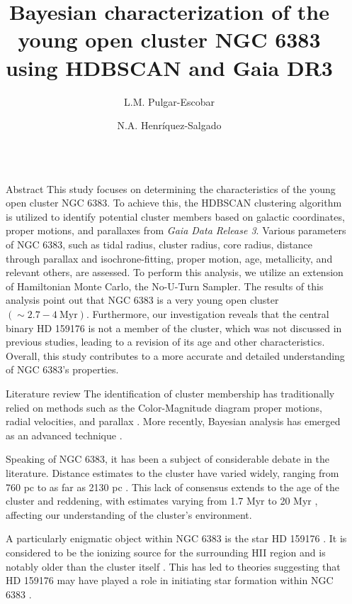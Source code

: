 \documentclass[final]{beamer}
\title{Bayesian characterization of the young open cluster NGC 6383 using HDBSCAN and Gaia DR3}
\author{L.M. Pulgar-Escobar \inst{1} \and N.A. Henríquez-Salgado \inst{1}}
\institute[UdeC]{\inst{1}~Departamento de Astronom{\'\i}a, Universidad de Concepci\'on, Chile}
\newlength{\sepwidth}
\newlength{\colwidth}
\newcommand{\separatorcolumn}{\begin{column}{\sepwidth}\end{column}}
\begin{document}
\begin{frame}[t]
\begin{columns}[t]
\separatorcolumn
\begin{column}{\colwidth}
  \begin{block}{Abstract}
    This study focuses on determining the characteristics of the young open cluster NGC 6383. To achieve this, the HDBSCAN clustering algorithm is utilized to identify potential cluster members based on galactic coordinates, proper motions, and parallaxes from {\sl Gaia Data Release 3}. Various parameters of NGC 6383, such as tidal radius, cluster radius, core radius, distance through parallax and isochrone-fitting, proper motion, age, metallicity, and relevant others, are assessed. To perform this analysis, we utilize an extension of Hamiltonian Monte Carlo, the No-U-Turn Sampler. The results of this analysis point out that NGC 6383 is a very young open cluster $(\sim 2.7 - 4~\mathrm{Myr})$. Furthermore, our investigation reveals that the central binary HD 159176 is not a member of the cluster, which was not discussed in previous studies, leading to a revision of its age and other characteristics. Overall, this study contributes to a more accurate and detailed understanding of NGC 6383's properties.
  \end{block}
  \begin{block}{Literature review}
The identification of cluster membership has traditionally relied on methods such as the Color-Magnitude diagram proper motions, radial velocities, and parallax \citep{2018A&A...610A..30A,1930LicOB..14..154T}. More recently, Bayesian analysis has emerged as an advanced technique \citep{2018A&A...610A..30A}.

Speaking of NGC 6383, it has been a subject of considerable debate in the literature. Distance estimates to the cluster have varied widely, ranging from 760 pc to as far as 2130 pc \citep{1930LicOB..14..154T, 1937LicOB..18...89Z, 1949ApJ...110..117S, 2018A&A...610A..30A}. This lack of consensus extends to the age of the cluster and reddening, with estimates varying from 1.7 Myr to 20 Myr \citep{1978MNRAS.182..607F,2007A&A...462..157P}, affecting our understanding of the cluster's environment.

A particularly enigmatic object within NGC 6383 is the star HD 159176 \citep{2010A&A...511A..25R}. It is considered to be the ionizing source for the surrounding HII region and is notably older than the cluster itself \citep{1978MNRAS.182..607F}. This has led to theories suggesting that HD 159176 may have played a role in initiating star formation within NGC 6383 \citep{1978MNRAS.182..607F}.


\end{block}
\end{column}
\end{columns}
\end{frame}
\end{document}
